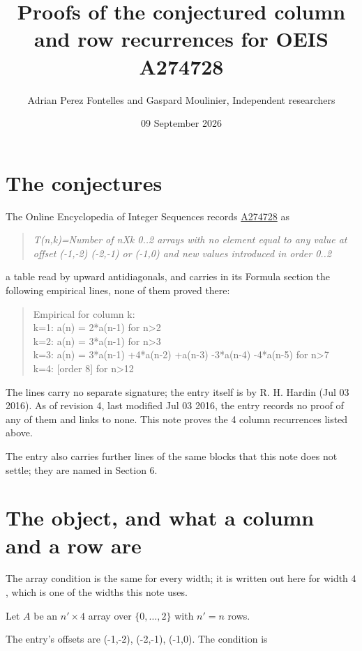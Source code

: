\documentclass[11pt]{article}
\title{Proofs of the conjectured column and row recurrences for OEIS A274728}
\author{Adrian Perez Fontelles and Gaspard Moulinier, Independent researchers}
\date{09 September 2026}
\theoremstyle{definition}
\begin{document}
\maketitle
\section{The conjectures}

The Online Encyclopedia of Integer Sequences records \href{https://oeis.org/A274728}{A274728} as

\begin{quote}\itshape T(n,k)=Number of nXk 0..2 arrays with no element equal to any value at offset (-1,-2) (-2,-1) or (-1,0) and new values introduced in order 0..2\end{quote}

a table read by upward antidiagonals, and carries in its Formula section the following empirical lines, none of them proved there:

\begin{quote}\ttfamily Empirical for column k:\\
k=1: a(n) = 2*a(n-1) for n>2\\k=2: a(n) = 3*a(n-1) for n>3\\k=3: a(n) = 3*a(n-1) +4*a(n-2) +a(n-3) -3*a(n-4) -4*a(n-5) for n>7\\k=4: [order 8] for n>12\end{quote}

The lines carry no separate signature; the entry itself is by R. H. Hardin (Jul 03 2016). As of revision 4, last modified Jul 03 2016, the entry records no proof of any of them and links to none. This note proves the 4 column recurrences listed above.

The entry also carries further lines of the same blocks that this note does not settle; they are named in Section 6.

\section{The object, and what a column and a row are}

The array condition is the same for every width; it is written out here for width $4$, which is one of the widths this note uses.

Let $A$ be an $n' \times 4$ array over $\{0,\dots,2\}$ with $n' = n$ rows.

The entry's offsets are (-1,-2), (-2,-1), (-1,0). The condition is
\end{document}
